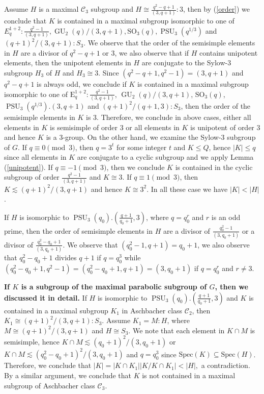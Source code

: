\documentclass[12pt,reqno]{amsart}
\newcommand{\PSU}{\operatorname{PSU}}
\newcommand{\GU}{\operatorname{GU}}
\theoremstyle{plain}
\theoremstyle{definition}
\begin{document}
  Assume $H$ is a maximal $\mathcal{C}_3$ subgroup and $H\cong \frac{q^2-q+1}{(3,q+1)}{:}3$, then by (\ref{order}) we conclude that $K$ is contained in a maximal subgroup isomorphic to one of $E_q^{1+2}{:}\frac{q^2-1}{(3,q+1)},\GU_2(q)/(3,q+1), \mathrm{SO}_3(q), \PSU_3(q^{1/3})$ and $(q+1)^2/(3,q+1){:}S_3$.
   We observe that the order of the semisimple elements in $H$ are a divisor of $q^2-q+1$ or $3$, we also observe that if $H$ contains unipotent elements, then the unipotent elements in $H$ are conjugate to the Sylow-$3$ subgroup $H_3$ of  $H$ and $H_3\cong 3$.
  Since $(q^2-q+1,q^2-1)=(3,q+1)$ and $q^2-q+1$ is always odd, we conclude if $K$ is contained in a maximal subgroup isomorphic to one of $\mathrm{E}_q^{1+2}{:}\frac{q^2-1}{(3,q+1)}$, $\GU_2(q)/(3,q+1)$, $\mathrm{SO}_3(q)$, $\PSU_3(q^{1/3}).(3,q+1)$ and $(q+1)^2/(q+1,3){:}S_3$, then the order of the semisimple elements in $K$ is $3$. 
  Therefore, we conclude in above cases, either all elements in $K$ is semisimple of order $3$ or all elements in $K$ is unipotent of order $3$ and hence $K$ is a $3$-group.
  On the other hand, we examine the Sylow-$3$ subgroup of $G$. If $q\equiv 0 \pmod 3$, then $q=3^t$ for some integer $t$ and $K\le Q$, hence $|K|\le q$ since all elements in $K$ are conjugate to a cyclic subgroup and we apply Lemma (\ref{unipotent}). If $q\equiv -1 \pmod 3$, then we conclude $K$ is contained in the cyclic subgroup of order $\frac{q^2-1}{(3,q+1)}$ and $K\cong 3$. If $q\equiv 1\pmod 3$, then $K\lesssim (q+1)^2/(3,q+1)$ and hence $K\cong 3^2$.
  In all these case we have $|K|<|H|$.
  
  If $H$ is isomorphic to $\PSU_3(q_0).(\frac{q+1}{q_0+1},3)$, where $q=q_0^r$ and $r$ is an odd prime, then the order of  semisimple elements in $H$ are a divisor of $\frac{q_0^2-1}{(3,q_0+1)}$ or a divisor of $\frac{q_0^2-q_0+1}{(3,q_0+1)}.$   
  We observe that $(q_0^2-1,q+1)=q_0+1$, we also observe that $q_0^2-q_0+1$ divides $q+1$ if $q=q_0^3$ while $(q_0^2-q_0+1,q^2-1)=(q_0^2-q_0+1,q+1)=(3,q_0+1)$ if $q=q_0^r$ and $r\neq 3$.
  
  \textbf{If $K$ is a subgroup of the maximal parabolic subgroup of $G$, then we discussed it in detail.}
  If $H$ is isomorphic to $\PSU_3(q_0).(\frac{q+1}{q_0+1},3)$ and $K$ is contained in a maximal subgroup $K_1$ in Aschbacher class $\mathcal{C}_2$, then $K_1\cong (q+1)^2/(3,q+1){:}S_3$. Assume $K_1=M{:}H$, where $M\cong (q+1)^2/(3,q+1)$ and $H\cong S_3$. 
  We note that each element in $K\cap M$ is semisimple, hence $K\cap M\lesssim (q_0+1)^2/(3,q_0+1)$ or $K\cap M \lesssim (q_0^2-q_0+1)^2/(3,q_0+1)$ and $q=q_0^3$ since $\mathrm{Spec}(K)\subseteq \mathrm{Spec}(H)$. Therefore, we conclude that $|K|=|K\cap K_1||K/K\cap K_1|<|H|,$ a contradiction. 
  By a similar argument, we conclude that $K$ is not contained in a maximal subgroup of Aschbacher class $\mathcal{C}_3$.
  
\end{document}
